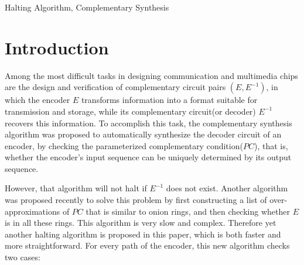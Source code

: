 \documentclass[journal]{IEEEtran}
\begin{document}
\begin{IEEEkeywords}
Halting Algorithm, Complementary Synthesis
\end{IEEEkeywords}






%
\IEEEpeerreviewmaketitle


\newtheorem{algo}{\textbf{Algorithm}}
\newtheorem{definition11}{\textbf{Definition}}
\newtheorem{lemma}{\textbf{Lemma}}
\newtheorem{theorem}{\textbf{Theorem}}
\newtheorem{proposition}{\textbf{Proposition}}

\section{Introduction}\label{sec_intro}
Among the most difficult tasks in designing communication
and multimedia chips
are the design and verification of complementary circuit pairs $(E, E^{-1})$,
in which the encoder $E$ transforms information into a format suitable for transmission and storage,
while its complementary circuit(or decoder) $E^{-1}$ recovers this information.
To accomplish this task,
the complementary synthesis algorithm was proposed \cite{ShengYuShen:iccad09,ShengYuShen:tcad}
to automatically synthesize the decoder circuit of an encoder,
by checking the parameterized complementary condition($PC$),
that is,
whether the encoder's input sequence can be uniquely determined by its output sequence.

However,
that algorithm will not halt if $E^{-1}$ does not exist.
Another algorithm was proposed recently \cite{ShengYuShen:fmcad10} to solve this problem
by first constructing a list of over-approximations of $PC$ that is similar to onion rings,
and then checking whether $E$ is in all these rings.
This algorithm is very slow and complex.
Therefore yet another halting algorithm is proposed in this paper,
which is both faster and more straightforward.
For every path of the encoder,
this new algorithm checks two cases:
\end{document}
